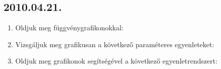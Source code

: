 \subsection*{2010.04.21.}
\begin{enumerate}
\item Oldjuk meg függvénygrafikonokkal:

\item Vizsgáljuk meg grafikusan a következő paraméteres egyenleteket:
\item Oldjuk meg grafikonok segítségével a következő egyenletrendszert:
\end{enumerate}
